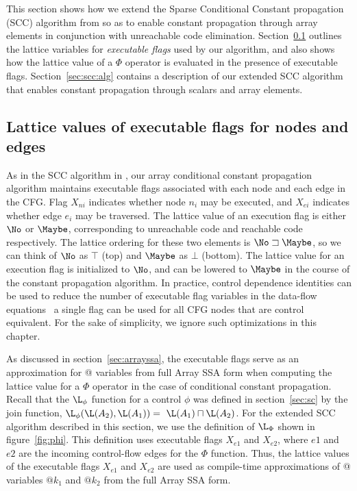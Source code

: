 This section shows how we extend the Sparse Conditional
Constant propagation (SCC) algorithm from \cite{WeZa91} so as to enable
constant propagation through array elements in conjunction with 
unreachable code elimination.
Section~\ref{sec:scc:flags} outlines the lattice variables
for {\it executable flags} used by our algorithm, and also shows
how the lattice value of a $\Phi$ operator is evaluated in the
presence of executable flags.
Section~\ref{sec:scc:alg} contains a description of our extended
SCC algorithm that enables constant propagation through scalars and
array elements.

\subsection{Lattice values of executable flags for nodes and edges}\label{sec:scc:flags}


As in the SCC algorithm in \cite{WeZa91},
our array conditional constant propagation
algorithm maintains executable flags associated with each node and
each edge in the CFG. Flag $X_{ni}$ indicates
whether node $n_i$ may be executed, and $X_{ei}$ indicates whether
edge $e_i$ may be traversed.  The lattice value of an execution
flag is either $\No$ or $\Maybe$, corresponding to
unreachable code and reachable code respectively.
The lattice ordering for these two elements is $\No \sqsupset \Maybe$,
so we can think of $\No$ as $\top$ (top) and $\Maybe$ as $\bot$ (bottom).
The lattice
value for an
execution flag is initialized to $\No$, and can be lowered to $\Maybe$
in the course of the constant propagation algorithm.
In practice, control dependence identities can be used to reduce the number of executable flag variables in the data-flow equations \eg\ a single flag can be used for all CFG nodes that are control equivalent.  For the sake of
simplicity, we ignore such optimizations in this chapter.


As discussed in section~\ref{sec:arrayssa}, 
the executable flags serve as an approximation for @ variables
from full Array SSA form when computing the lattice value
for a $\Phi$ operator in the case of conditional constant propagation.
Recall that the
$\L_{\phi}$ function for a control $\phi$
was defined in section~\ref{sec:sc} by the  join function,
$\L_{\phi}(\L(A_2),\L(A_1)) =\ \L(A_1) \sqcap
\L(A_2)$.  For the extended SCC algorithm described in this section,
we use the definition of $\L_{\Phi}$ shown
in figure~\ref{fig:phi}.  This definition uses executable flags
$X_{e1}$ and $X_{e2}$, where $e1$ and $e2$ are the incoming control-flow edges for the $\Phi$ function.  Thus, the lattice values of the
executable flags $X_{e1}$ and $X_{e2}$
are used as compile-time approximations of 
@ variables $@k_1$ and $@k_2$ from the
full Array SSA form.


